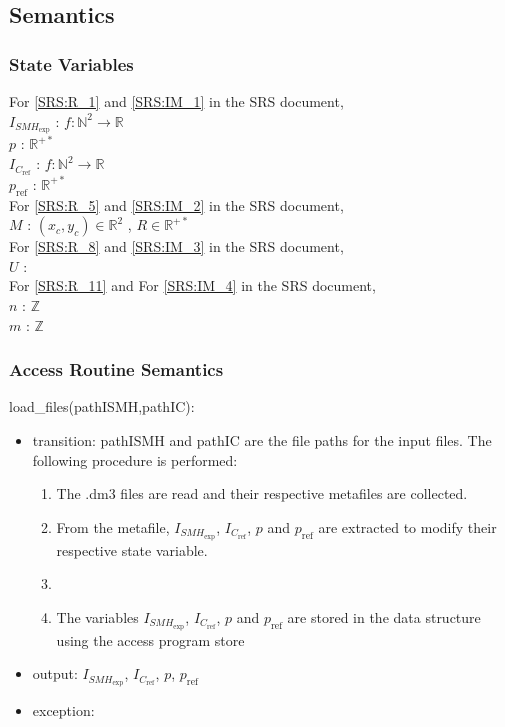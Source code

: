 \documentclass[12pt, titlepage]{article}
\begin{document}
\subsection{Semantics}

\subsubsection{State Variables}

\noindent For \cref{SRS:R_1} and \cref{SRS:IM_1} in the SRS document,\\
\noindent$I_{\mathit{SMH}_{\text{exp}}}$ : $f:\mathbb{N}^2\rightarrow\mathbb{R}$ \\
$p$ : $\mathbb{R}^{+*}$\\
$I_{C_{\text{ref}}}$ : $f:\mathbb{N}^2\rightarrow\mathbb{R}$\\
$p_{\text{ref}}$ : $\mathbb{R}^{+*}$ \\

\noindent For \cref{SRS:R_5} and \cref{SRS:IM_2} in the SRS document,\\
\noindent$M$ : $(x_c,y_c) \in \mathbb{R}^2$ , $R \in \mathbb{R}^{+*}$\\

\noindent For \cref{SRS:R_8} and \cref{SRS:IM_3} in the SRS document,\\
\noindent$U$ :\\ 

\noindent For \cref{SRS:R_11} and For \cref{SRS:IM_4} in the SRS document,\\
\noindent$n$ : $\mathbb{Z}$\\
$m$ : $\mathbb{Z}$\\

\subsubsection{Access Routine Semantics}

\noindent load{\_}files(pathISMH,pathIC):
\begin{itemize}
\item transition: pathISMH and pathIC are the file paths for the input files. The following procedure is performed:
\begin{enumerate}
\item The .dm3 files are read and their respective  metafiles are collected.
\item From the metafile, $I_{\mathit{SMH}_{\text{exp}}}$, $I_{C_{\text{ref}}}$, $p$ and $p_{\text{ref}}$ are extracted to modify their respective state variable.
\item 
\item The variables $I_{\mathit{SMH}_{\text{exp}}}$, $I_{C_{\text{ref}}}$, $p$ and $p_{\text{ref}}$ are stored in the data structure using the access program store 
\end{enumerate}  
\item output:  $I_{\mathit{SMH}_{\text{exp}}}$, $I_{C_{\text{ref}}}$, $p$, $p_{\text{ref}}$ 
\item exception:  
\end{itemize}
\end{document}
